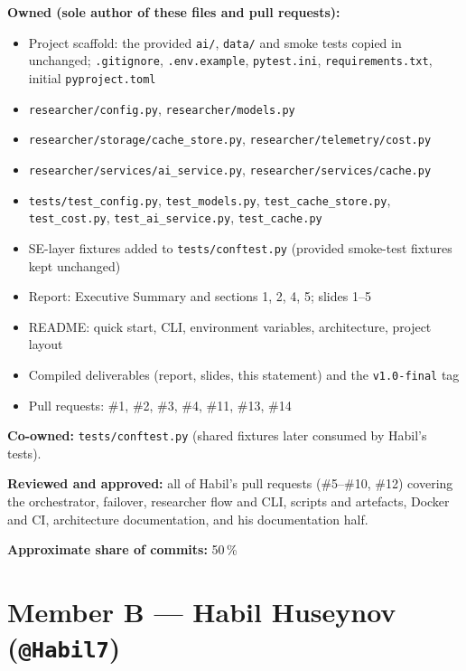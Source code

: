 \documentclass[11pt,a4paper]{article}
\begin{document}
\textbf{Owned (sole author of these files and pull requests):}
\begin{itemize}[topsep=1pt,itemsep=0pt,leftmargin=1.4em]
  \item Project scaffold: the provided \texttt{ai/}, \texttt{data/} and smoke tests copied in unchanged; \texttt{.gitignore}, \texttt{.env.example}, \texttt{pytest.ini}, \texttt{requirements.txt}, initial \texttt{pyproject.toml}
  \item \texttt{researcher/config.py}, \texttt{researcher/models.py}
  \item \texttt{researcher/storage/cache\_store.py}, \texttt{researcher/telemetry/cost.py}
  \item \texttt{researcher/services/ai\_service.py}, \texttt{researcher/services/cache.py}
  \item \texttt{tests/test\_config.py}, \texttt{test\_models.py}, \texttt{test\_cache\_store.py}, \texttt{test\_cost.py}, \texttt{test\_ai\_service.py}, \texttt{test\_cache.py}
  \item SE-layer fixtures added to \texttt{tests/conftest.py} (provided smoke-test fixtures kept unchanged)
  \item Report: Executive Summary and sections 1, 2, 4, 5; slides 1--5
  \item README: quick start, CLI, environment variables, architecture, project layout
  \item Compiled deliverables (report, slides, this statement) and the \texttt{v1.0-final} tag
  \item Pull requests: \#1, \#2, \#3, \#4, \#11, \#13, \#14
\end{itemize}

\textbf{Co-owned:} \texttt{tests/conftest.py} (shared fixtures later consumed by Habil's tests).

\textbf{Reviewed and approved:} all of Habil's pull requests (\#5--\#10, \#12) covering the
orchestrator, failover, researcher flow and CLI, scripts and artefacts, Docker and CI,
architecture documentation, and his documentation half.

\textbf{Approximate share of commits:} 50\,\%

\section{Member B --- Habil Huseynov (\texttt{@Habil7})}
\end{document}
